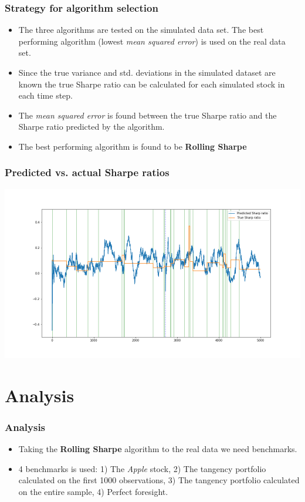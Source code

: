 \documentclass{beamer}
\begin{document}
\begin{frame}
\frametitle{Strategy for algorithm selection}
\begin{itemize}
    \item The three algorithms are tested on the simulated data set. The best performing algorithm (lowest \textit{mean squared error}) is used on the real data set.
    \item Since the true variance and std. deviations in the simulated dataset are known the true Sharpe ratio can be calculated for each simulated stock in each time step.
    \item The \textit{mean squared error} is found between the true Sharpe ratio and the Sharpe ratio predicted by the algorithm.
    \item The best performing algorithm is found to be \textbf{Rolling Sharpe}
\end{itemize}

\end{frame}


\begin{frame}
\frametitle{Predicted vs. actual Sharpe ratios}

\centering
\includegraphics[scale=0.32]{../figures/rolling_sharp_prediction_simulated.png}


\end{frame}



\section{Analysis}

\begin{frame}
\frametitle{Analysis}

\begin{itemize}
\item Taking the \textbf{Rolling Sharpe} algorithm to the real data we need benchmarks.
\item 4 benchmarks is used: 1) The \textit{Apple} stock, 2) The tangency portfolio calculated on the first 1000 observations, 3) The tangency portfolio calculated on the entire sample, 4) Perfect foresight.
\end{itemize}

\end{frame}
\end{document}
